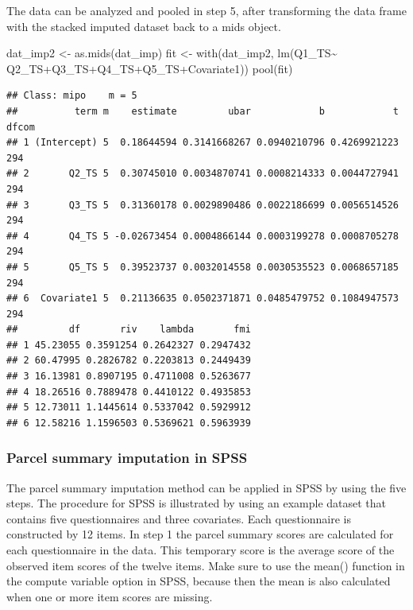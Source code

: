 \documentclass[
]{book}
\newenvironment{Shaded}{\begin{snugshade}}{\end{snugshade}}
\newcommand{\FunctionTok}[1]{\textcolor[rgb]{0.00,0.00,0.00}{#1}}
\newcommand{\NormalTok}[1]{#1}
\newcommand{\OtherTok}[1]{\textcolor[rgb]{0.56,0.35,0.01}{#1}}
\newcommand{\SpecialCharTok}[1]{\textcolor[rgb]{0.00,0.00,0.00}{#1}}
\begin{document}
The data can be analyzed and pooled in step 5, after transforming the data frame with the stacked imputed dataset back to a mids object.

\begin{Shaded}
\begin{Highlighting}[]
\NormalTok{dat\_imp2 }\OtherTok{\textless{}{-}} \FunctionTok{as.mids}\NormalTok{(dat\_imp)}
\NormalTok{fit }\OtherTok{\textless{}{-}} \FunctionTok{with}\NormalTok{(dat\_imp2, }\FunctionTok{lm}\NormalTok{(Q1\_TS}\SpecialCharTok{\textasciitilde{}}\NormalTok{ Q2\_TS}\SpecialCharTok{+}\NormalTok{Q3\_TS}\SpecialCharTok{+}\NormalTok{Q4\_TS}\SpecialCharTok{+}\NormalTok{Q5\_TS}\SpecialCharTok{+}\NormalTok{Covariate1))}
\FunctionTok{pool}\NormalTok{(fit)}
\end{Highlighting}
\end{Shaded}

\begin{verbatim}
## Class: mipo    m = 5 
##          term m    estimate         ubar            b            t dfcom
## 1 (Intercept) 5  0.18644594 0.3141668267 0.0940210796 0.4269921223   294
## 2       Q2_TS 5  0.30745010 0.0034870741 0.0008214333 0.0044727941   294
## 3       Q3_TS 5  0.31360178 0.0029890486 0.0022186699 0.0056514526   294
## 4       Q4_TS 5 -0.02673454 0.0004866144 0.0003199278 0.0008705278   294
## 5       Q5_TS 5  0.39523737 0.0032014558 0.0030535523 0.0068657185   294
## 6  Covariate1 5  0.21136635 0.0502371871 0.0485479752 0.1084947573   294
##         df       riv    lambda       fmi
## 1 45.23055 0.3591254 0.2642327 0.2947432
## 2 60.47995 0.2826782 0.2203813 0.2449439
## 3 16.13981 0.8907195 0.4711008 0.5263677
## 4 18.26516 0.7889478 0.4410122 0.4935853
## 5 12.73011 1.1445614 0.5337042 0.5929912
## 6 12.58216 1.1596503 0.5369621 0.5963939
\end{verbatim}

\hypertarget{parcel-summary-imputation-in-spss}{%
\subsubsection{Parcel summary imputation in SPSS}\label{parcel-summary-imputation-in-spss}}

The parcel summary imputation method can be applied in SPSS by using the five steps. The procedure for SPSS is illustrated by using an example dataset that contains five questionnaires and three covariates. Each questionnaire is constructed by 12 items. In step 1 the parcel summary scores are calculated for each questionnaire in the data. This temporary score is the average score of the observed item scores of the twelve items. Make sure to use the mean() function in the compute variable option in SPSS, because then the mean is also calculated when one or more item scores are missing.
\end{document}
